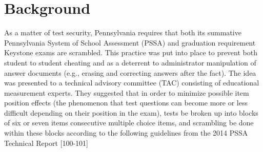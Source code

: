 \documentclass[11pt]{article}
\begin{document}
\section{Background}
As a matter of test security, Pennsylvania requires that both its
summative Pennsylvania System of School Assessment (PSSA) and
graduation requirement Keystone exams are scrambled. This practice was
put into place to prevent both student to student cheating and as a
deterrent to administrator manipulation of answer documents (e.g.,
erasing and correcting answers after the fact). The idea was presented
to a technical advisory committee (TAC) consisting of educational
measurement experts. They suggested that in order to minimize possible
item position effects (the phenomenon that test questions can become
more or less difficult depending on their position in the exam), tests
be broken up into blocks of six or seven items consecutive multiple
choice items, and scrambling be done within these blocks according to
the following guidelines from the 2014 PSSA Technical Report
\cite{PSSAtr}[100-101]
\end{document}
